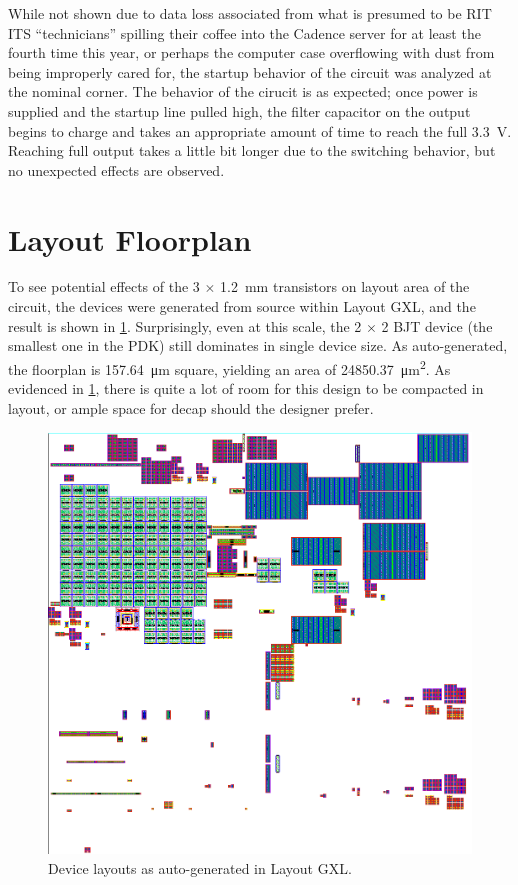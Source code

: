 \documentclass[11pt,letterpaper]{article}
\begin{document}
While not shown due to data loss associated from what is presumed to be RIT ITS ``technicians'' spilling their coffee into the Cadence server for at least the fourth time this year, or perhaps the computer case overflowing with dust from being improperly cared for, the startup behavior of the circuit was analyzed at the nominal corner. The behavior of the cirucit is as expected; once power is supplied and the startup line pulled high, the filter capacitor on the output begins to charge and takes an appropriate amount of time to reach the full \qty{3.3}{\V}. Reaching full output takes a little bit longer due to the switching behavior, but no unexpected effects are observed.

\section{Layout Floorplan}

To see potential effects of the 3 \(\times\) \qty{1.2}{\mm} transistors on layout area of the circuit, the devices were generated from source within Layout GXL, and the result is shown in \cref{fig:cp_layout}. Surprisingly, even at this scale, the 2 \(\times\) 2 BJT device (the smallest one in the PDK) still dominates in single device size. As auto-generated, the floorplan is \qty{157.64}{\um} square, yielding an area of \qty{24850.37}{\um\squared}. As evidenced in \cref{fig:cp_layout}, there is quite a lot of room for this design to be compacted in layout, or ample space for decap should the designer prefer.

\begin{figure}[tb]
    \centering
    \includegraphics[width=\columnwidth]{images/cp_layout_generated.eps}
    \caption{Device layouts as auto-generated in Layout GXL.}
    \label{fig:cp_layout}
\end{figure}
\end{document}
